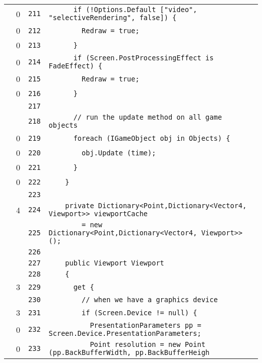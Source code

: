 \documentclass[a4paper,10pt]{article}
\begin{document}
\begin{longtable}[l]{lrrl}
\cellcolor{red} & 0 & \verb~211~ & \verb~      if (!Options.Default ["video", "selectiveRendering", false]) {~\\
\cellcolor{red} & 0 & \verb~212~ & \verb~        Redraw = true;~\\
\cellcolor{red} & 0 & \verb~213~ & \verb~      }~\\
\cellcolor{red} & 0 & \verb~214~ & \verb~      if (Screen.PostProcessingEffect is FadeEffect) {~\\
\cellcolor{red} & 0 & \verb~215~ & \verb~        Redraw = true;~\\
\cellcolor{red} & 0 & \verb~216~ & \verb~      }~\\
\cellcolor{gray} &  & \verb~217~ & \verb~~\\
\cellcolor{gray} &  & \verb~218~ & \verb~      // run the update method on all game objects~\\
\cellcolor{red} & 0 & \verb~219~ & \verb~      foreach (IGameObject obj in Objects) {~\\
\cellcolor{red} & 0 & \verb~220~ & \verb~        obj.Update (time);~\\
\cellcolor{red} & 0 & \verb~221~ & \verb~      }~\\
\cellcolor{red} & 0 & \verb~222~ & \verb~    }~\\
\cellcolor{gray} &  & \verb~223~ & \verb~~\\
\cellcolor{green} & 4 & \verb~224~ & \verb~    private Dictionary<Point,Dictionary<Vector4, Viewport>> viewportCache~\\
\cellcolor{gray} &  & \verb~225~ & \verb~        = new Dictionary<Point,Dictionary<Vector4, Viewport>> ();~\\
\cellcolor{gray} &  & \verb~226~ & \verb~~\\
\cellcolor{gray} &  & \verb~227~ & \verb~    public Viewport Viewport~\\
\cellcolor{gray} &  & \verb~228~ & \verb~    {~\\
\cellcolor{green} & 3 & \verb~229~ & \verb~      get {~\\
\cellcolor{gray} &  & \verb~230~ & \verb~        // when we have a graphics device~\\
\cellcolor{green} & 3 & \verb~231~ & \verb~        if (Screen.Device != null) {~\\
\cellcolor{red} & 0 & \verb~232~ & \verb~          PresentationParameters pp = Screen.Device.PresentationParameters;~\\
\cellcolor{red} & 0 & \verb~233~ & \verb~          Point resolution = new Point (pp.BackBufferWidth, pp.BackBufferHeigh~\\

\end{longtable}
\end{document}
